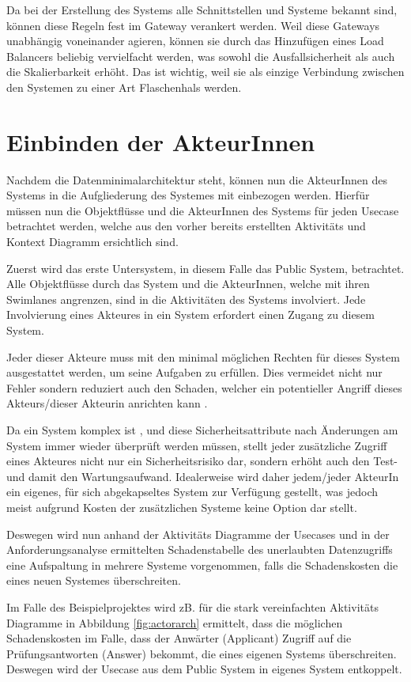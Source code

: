 Da bei der Erstellung des Systems alle Schnittstellen und Systeme bekannt sind, können diese Regeln fest im Gateway verankert werden. Weil diese Gateways unabhängig voneinander agieren, können sie durch das Hinzufügen eines Load Balancers beliebig vervielfacht werden, was sowohl die Ausfallsicherheit als auch die Skalierbarkeit erhöht. Das ist wichtig, weil sie als einzige Verbindung zwischen den Systemen zu einer Art Flaschenhals werden.


\section{Einbinden der AkteurInnen}
Nachdem die Datenminimalarchitektur steht, können nun die AkteurInnen des Systems in die Aufgliederung des Systemes mit einbezogen werden. Hierfür müssen nun die Objektflüsse und die AkteurInnen des Systems für jeden Usecase betrachtet werden, welche aus den vorher bereits erstellten Aktivitäts und Kontext Diagramm ersichtlich sind.

Zuerst wird das erste Untersystem, in diesem Falle das Public System, betrachtet. Alle Objektflüsse durch das System und die AkteurInnen, welche mit ihren Swimlanes angrenzen, sind in die Aktivitäten des Systems involviert. Jede Involvierung eines Akteures in ein System erfordert einen Zugang zu diesem System.

Jeder dieser Akteure muss mit den minimal möglichen Rechten für dieses System ausgestattet werden, um seine Aufgaben zu erfüllen. Dies vermeidet nicht nur Fehler sondern reduziert auch den Schaden, welcher ein potentieller Angriff dieses Akteurs/dieser Akteurin anrichten kann \cite[1. A]{leastpriv}.

Da ein System komplex ist \cite[S. 7]{softarch}, und diese Sicherheitsattribute nach Änderungen am System immer wieder überprüft werden müssen, stellt jeder zusätzliche Zugriff eines Akteures nicht nur ein Sicherheitsrisiko dar, sondern erhöht auch den Test- und damit den Wartungsaufwand. Idealerweise wird daher jedem/jeder AkteurIn ein eigenes, für sich abgekapseltes System zur Verfügung gestellt, was jedoch meist aufgrund Kosten der zusätzlichen Systeme keine Option dar stellt.

Deswegen wird nun anhand der Aktivitäts Diagramme der Usecases und in der Anforderungsanalyse ermittelten Schadenstabelle des unerlaubten Datenzugriffs eine Aufspaltung in mehrere Systeme vorgenommen, falls die Schadenskosten die eines neuen Systemes überschreiten.

Im Falle des Beispielprojektes wird zB. für die stark vereinfachten Aktivitäts Diagramme in Abbildung \ref{fig:actorarch} ermittelt, dass die möglichen Schadenskosten im Falle, dass der Anwärter (Applicant) Zugriff auf die Prüfungsantworten (Answer) bekommt, die eines eigenen Systems überschreiten. Deswegen wird der Usecase aus dem Public System in eigenes System entkoppelt.

